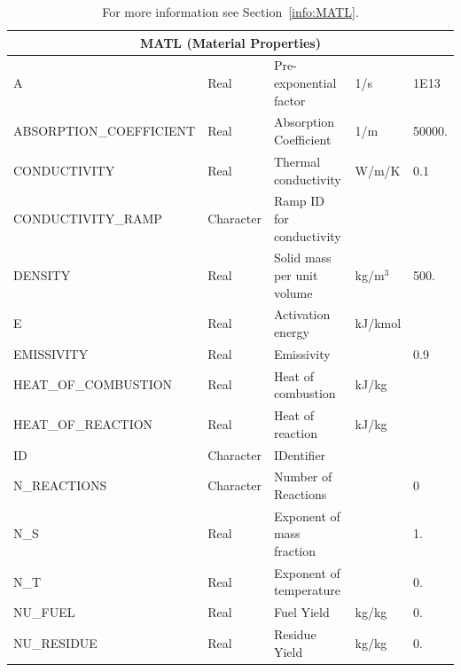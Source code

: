 \documentclass[11pt]{book}
\begin{document}
\begin{table}[H]
\caption{For more information see Section~\ref{info:MATL}.}\label{tbl:MATL}
\noindent
\begin{tabular*}{\textwidth}{@{\extracolsep{\fill}}|l|l|l|l|l|}
\hline
\multicolumn{5}{|c|}{{\ct MATL} (Material Properties)} \\ \hline \hline
{\ct A}                       & Real        & Pre-exponential factor      &    1/s              & 1E13      \\ \hline
{\ct ABSORPTION\_COEFFICIENT} & Real        & Absorption Coefficient      &    1/m              & 50000.     \\ \hline
{\ct CONDUCTIVITY}            & Real        & Thermal conductivity        & W/m/K               & 0.1    \\ \hline
{\ct CONDUCTIVITY\_RAMP}      & Character   & Ramp ID for conductivity    &                     &        \\ \hline
{\ct DENSITY}                 & Real        & Solid mass per unit volume  & kg/m$^3$            & 500.   \\ \hline
{\ct E}                       & Real        & Activation energy           & kJ/kmol             &        \\ \hline
{\ct EMISSIVITY    }          & Real        & Emissivity                  &                     & 0.9    \\ \hline
{\ct HEAT\_OF\_COMBUSTION}    & Real        & Heat of combustion          & kJ/kg               &        \\ \hline
{\ct HEAT\_OF\_REACTION}      & Real        & Heat of reaction            & kJ/kg               &        \\ \hline
{\ct ID     }                 & Character   & IDentifier                  &                     &        \\ \hline
{\ct N\_REACTIONS}            & Character   & Number of Reactions         &                     & 0      \\ \hline
{\ct N\_S}                    & Real        & Exponent of mass fraction   &                     & 1.     \\ \hline
{\ct N\_T}                    & Real        & Exponent of temperature     &                     & 0.     \\ \hline
{\ct NU\_FUEL}                & Real        & Fuel Yield                  & kg/kg               & 0.     \\ \hline
{\ct NU\_RESIDUE}             & Real        & Residue Yield               & kg/kg               & 0.     \\ \hline

\end{tabular*}
\end{table}
\end{document}

